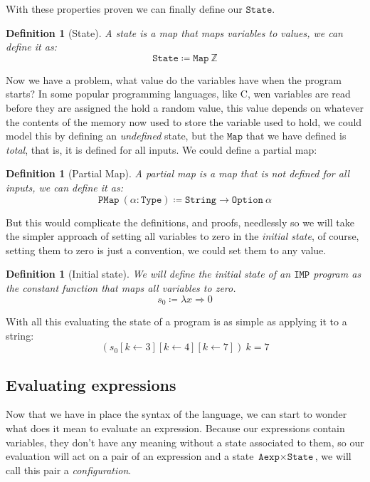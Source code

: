 \documentclass[
  a4paper, 
  10pt, 
  parskip=half, 
  DIV=20,
  toc=bibliography,
  usegeometry,
]{scrartcl}
\newtheorem{definition}[theorem]{Definition}
\newcommand{\tyfont}[1]{\texttt{#1}}
\renewcommand{\mapsto}{\Rightarrow}
\begin{document}
With these properties proven we can finally define our \(\tyfont{State}\).

\begin{definition}[State]
  A state is a map that maps variables to values, we can define it as:
  \[
  \tyfont{State} \coloneqq \tyfont{Map} \ \mathbb{Z}
  \]
\end{definition}

Now we have a problem, what value do the variables have when the program starts?
In some popular programming languages, like C, wen variables are read before
they are assigned the hold a random value, this value depends on whatever
the contents of the memory now used to store the variable used to hold, we could
model this by defining an \emph{undefined} state, but the \(\tyfont{Map}\)
that we have defined is \emph{total}, that is, it is defined for all inputs. 
We could define a partial map:

\begin{definition}[Partial Map]
  A partial map is a map that is not defined for all inputs, we can define
  it as:
  \[
  \tyfont{PMap} \ (\alpha : \tyfont{Type}) \coloneqq \tyfont{String} \to \tyfont{Option} \ \alpha
  \]
\end{definition}

But this would complicate the definitions, and proofs, needlessly so we will
take the simpler approach of setting all variables to zero in the \emph{initial state},
of course, setting them to zero is just a convention, we could set them to any
value.

\begin{definition}[Initial state]
  We will define the \emph{initial state} of an \(\texttt{IMP}\) program as the
  constant function that maps all variables to zero.
  \[
  s_0 \coloneqq \lambda x \mapsto 0
  \]
\end{definition}

With all this evaluating the state of a program is as simple as applying it to
a string:
\[
(s_0[k \leftarrow 3][k \leftarrow 4][k \leftarrow 7]) \ k = 7
\]

\subsection{Evaluating expressions}

Now that we have in place the syntax of the language, we can start to wonder
what does it mean to evaluate an expression. Because our expressions
contain variables, they don't have any meaning without a state associated to
them, so our evaluation will act on a pair of an expression and a state 
\(\tyfont{Aexp} \times \tyfont{State}\), we 
will call this pair a \emph{configuration}.
\end{document}

